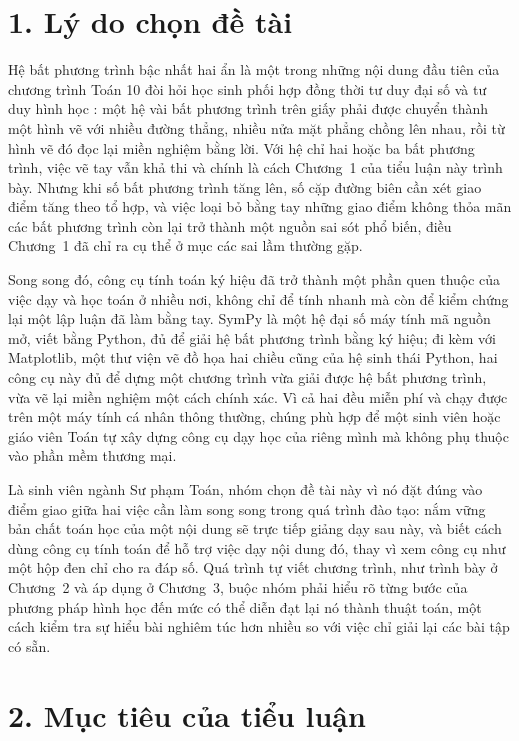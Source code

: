 \documentclass[12pt,a4paper]{report}
\begin{document}
\section*{1. Lý do chọn đề tài}

Hệ bất phương trình bậc nhất hai ẩn là một trong những nội dung đầu tiên của chương trình Toán 10 đòi hỏi học sinh phối hợp đồng thời tư duy đại số và tư duy hình học \cite{sgk10-ktt}: một hệ vài bất phương trình trên giấy phải được chuyển thành một hình vẽ với nhiều đường thẳng, nhiều nửa mặt phẳng chồng lên nhau, rồi từ hình vẽ đó đọc lại miền nghiệm bằng lời. Với hệ chỉ hai hoặc ba bất phương trình, việc vẽ tay vẫn khả thi và chính là cách Chương~1 của tiểu luận này trình bày. Nhưng khi số bất phương trình tăng lên, số cặp đường biên cần xét giao điểm tăng theo tổ hợp, và việc loại bỏ bằng tay những giao điểm không thỏa mãn các bất phương trình còn lại trở thành một nguồn sai sót phổ biến, điều Chương~1 đã chỉ ra cụ thể ở mục các sai lầm thường gặp.

Song song đó, công cụ tính toán ký hiệu đã trở thành một phần quen thuộc của việc dạy và học toán ở nhiều nơi, không chỉ để tính nhanh mà còn để kiểm chứng lại một lập luận đã làm bằng tay. SymPy là một hệ đại số máy tính mã nguồn mở, viết bằng Python, đủ để giải hệ bất phương trình bằng ký hiệu; đi kèm với Matplotlib, một thư viện vẽ đồ họa hai chiều cũng của hệ sinh thái Python, hai công cụ này đủ để dựng một chương trình vừa giải được hệ bất phương trình, vừa vẽ lại miền nghiệm một cách chính xác. Vì cả hai đều miễn phí và chạy được trên một máy tính cá nhân thông thường, chúng phù hợp để một sinh viên hoặc giáo viên Toán tự xây dựng công cụ dạy học của riêng mình mà không phụ thuộc vào phần mềm thương mại.

Là sinh viên ngành Sư phạm Toán, nhóm chọn đề tài này vì nó đặt đúng vào điểm giao giữa hai việc cần làm song song trong quá trình đào tạo: nắm vững bản chất toán học của một nội dung sẽ trực tiếp giảng dạy sau này, và biết cách dùng công cụ tính toán để hỗ trợ việc dạy nội dung đó, thay vì xem công cụ như một hộp đen chỉ cho ra đáp số. Quá trình tự viết chương trình, như trình bày ở Chương~2 và áp dụng ở Chương~3, buộc nhóm phải hiểu rõ từng bước của phương pháp hình học đến mức có thể diễn đạt lại nó thành thuật toán, một cách kiểm tra sự hiểu bài nghiêm túc hơn nhiều so với việc chỉ giải lại các bài tập có sẵn.

\section*{2. Mục tiêu của tiểu luận}
\end{document}
